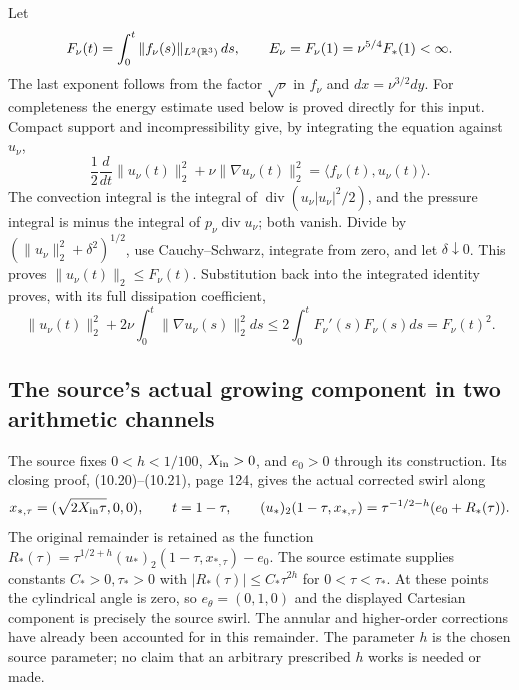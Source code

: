 Let
\[
 F_\nu(t)=\int_0^t\|f_\nu(s)\|_{L^2(\mathbb R^3)}\,ds,
 \qquad E_\nu=F_\nu(1)=\nu^{5/4}F_*(1)<\infty.
\]
The last exponent follows from the factor $\sqrt\nu$ in $f_\nu$ and
$dx=\nu^{3/2}dy$. For completeness the energy estimate used below is
proved directly for this input. Compact support and incompressibility
give, by integrating the equation against $u_\nu$,
\[
 \frac12\frac{d}{dt}\|u_\nu(t)\|_2^2
       +\nu\|\nabla u_\nu(t)\|_2^2
       =\langle f_\nu(t),u_\nu(t)\rangle.
\]
The convection integral is the integral of
$\operatorname{div}(u_\nu|u_\nu|^2/2)$, and the pressure integral is
minus the integral of $p_\nu\operatorname{div}u_\nu$; both vanish.
Divide by $(\|u_\nu\|_2^2+\delta^2)^{1/2}$, use Cauchy--Schwarz,
integrate from zero, and let $\delta\downarrow0$. This proves
$\|u_\nu(t)\|_2\leq F_\nu(t)$. Substitution back into the integrated
identity proves, with its full dissipation coefficient,
\[
 \|u_\nu(t)\|_2^2+2\nu\int_0^t\|\nabla u_\nu(s)\|_2^2ds
 \leq 2\int_0^t F_\nu'(s)F_\nu(s)ds=F_\nu(t)^2.
\]

\subsection{The source's actual growing component in two arithmetic channels}

The source fixes $0<h<1/100$, $X_{\rm in}>0$, and $e_0>0$ through
its construction. Its closing proof, (10.20)--(10.21), page 124, gives
the actual corrected swirl along
\[
 x_{*,\tau}=(\sqrt{2X_{\rm in}\tau},0,0),\qquad t=1-\tau,
 \qquad
 (u_*)_2(1-\tau,x_{*,\tau})
   =\tau^{-1/2-h}(e_0+R_*(\tau)).
\]
The original remainder is retained as the function
$R_*(\tau)=\tau^{1/2+h}(u_*)_2(1-\tau,x_{*,\tau})-e_0$.
The source estimate supplies constants $C_*>0,\tau_*>0$ with
$|R_*(\tau)|\leq C_*\tau^{2h}$ for $0<\tau<\tau_*$.
At these points the cylindrical angle is zero, so
$e_\theta=(0,1,0)$ and the displayed Cartesian component is precisely
the source swirl. The annular and higher-order corrections have already
been accounted for in this remainder. The parameter $h$ is the chosen
source parameter; no claim that an arbitrary prescribed $h$ works is
needed or made.

